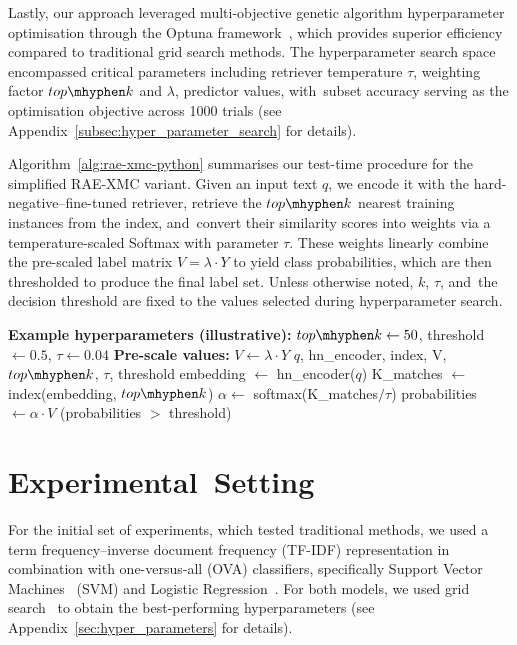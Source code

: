 \documentclass[make,article,accept,pdftex,moreauthors]{Definitions/mdpi}
\begin{document}
Lastly, our approach leveraged multi-objective genetic algorithm hyperparameter optimisation through the Optuna framework~\citep{akiba2019optunanextgenerationhyperparameteroptimization}, which provides superior efficiency compared to traditional grid search methods.
The hyperparameter search space encompassed critical parameters including retriever temperature $\tau$, weighting factor $top\mhyphen k$ and $\lambda$, predictor values, with~subset accuracy serving as the optimisation objective across 1000 trials (see Appendix~\ref{subsec:hyper_parameter_search} for details).

Algorithm~\ref{alg:rae-xmc-python} summarises our test-time procedure for the simplified RAE-XMC variant. 
Given an input text $q$, we encode it with the hard-negative–fine-tuned retriever, retrieve the $top\mhyphen k$ nearest training instances from the index, and~convert their similarity scores into weights via a temperature-scaled Softmax with parameter $\tau$. 
These weights linearly combine the pre-scaled label matrix $V=\lambda \cdot Y$ to yield class probabilities, which are then thresholded to produce the final label set. 
Unless otherwise noted, $k$, $\tau$, and~the decision threshold are fixed to the values selected during hyperparameter search.
\begin{algorithm}[H]
\caption{Modified RAE-XMC~Inference}
\label{alg:rae-xmc-python}
\begin{algorithmic}[1]
\State \textbf{Example hyperparameters (illustrative):} $top\mhyphen k \gets 50$, threshold $\gets 0.5$, $\tau\gets 0.04$
\State \textbf{Pre-scale values:} $V \gets \lambda \cdot Y$
 {$q$, hn\_encoder, index, V, $top\mhyphen k$, $\tau$, threshold}
  \State embedding $\gets$ hn\_encoder($q$)
  \State K\_matches $\gets$ index(embedding, $top\mhyphen k$)
  \State $\alpha \gets $ softmax(K\_matches$/\tau$)
  \State probabilities $\gets \alpha \cdot V$
  \State \Return (probabilities $>$ threshold)
\EndFunction
\end{algorithmic}
\end{algorithm}



\section{Experimental~Setting}
\label{sec:experiments}

For the initial set of experiments, which tested traditional methods, we used a term frequency–inverse document frequency (TF-IDF) representation in combination with one-versus-all (OVA) classifiers, specifically Support Vector Machines~\citep{cortes1995support} (SVM) and Logistic Regression~\citep{cox58reg}.
For both models, we used grid search~\citep{scikit-learn} to obtain the best-performing hyperparameters (see Appendix~\ref{sec:hyper_parameters} for details).
\end{document}
